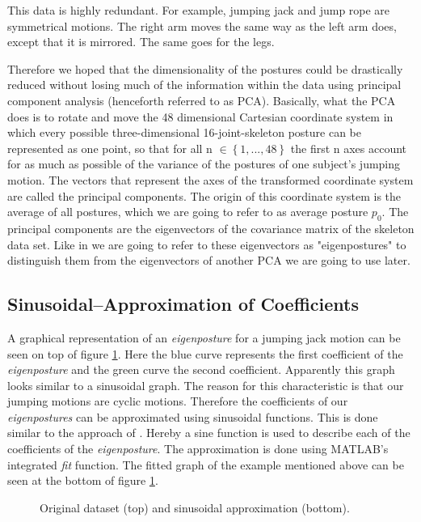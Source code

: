 \documentclass[a4paper]{article}
\begin{document}
This data is highly redundant.
For example, jumping jack and jump rope are symmetrical motions.
The right arm moves the same way as the left arm does, except that it is mirrored.
The same goes for the legs.

Therefore we hoped that the dimensionality of the postures could be drastically reduced without losing much of the information within the data using principal component analysis (henceforth referred to as PCA).
Basically, what the PCA does is to rotate and move the 48 dimensional Cartesian coordinate system in which every possible three-dimensional 16-joint-skeleton posture can be represented as one point, so that for all n $\in \left\{1, ..., 48\right\}$ the first n axes account for as much as possible of the variance of the postures of one subject's jumping motion.
The vectors that represent the axes of the transformed coordinate system are called the principal components.
The origin of this coordinate system is the average of all postures, which we are going to refer to as average posture $p_{0}$.
The principal components are the eigenvectors of the covariance matrix of the skeleton data set.
Like in \cite{origin} we are going to refer to these eigenvectors as "eigenpostures" to distinguish them from the eigenvectors of another PCA we are going to use later.

\subsection{Sinusoidal--Approximation of Coefficients}
A graphical representation of an \emph{eigenposture} for a jumping jack motion can be seen on top of figure \ref{fig:approx}.
Here the blue curve represents the first coefficient of the \emph{eigenposture} and the green curve the second coefficient.
Apparently this graph looks similar to a sinusoidal graph.
The reason for this characteristic is that our jumping motions are cyclic motions.
Therefore the coefficients of our \emph{eigenpostures} can be approximated using sinusoidal functions.
This is done similar to the approach of \cite{origin}.
Hereby a sine function is used to describe each of the coefficients of the \emph{eigenposture}.
The approximation is done using MATLAB's integrated \emph{fit} function.
The fitted graph of the example mentioned above can be seen at the bottom of figure \ref{fig:approx}.

\begin{figure}[htb]
		\centering
		\caption{Original dataset (top) and sinusoidal approximation (bottom).}
		\label{fig:approx}
\end{figure}
\end{document}
